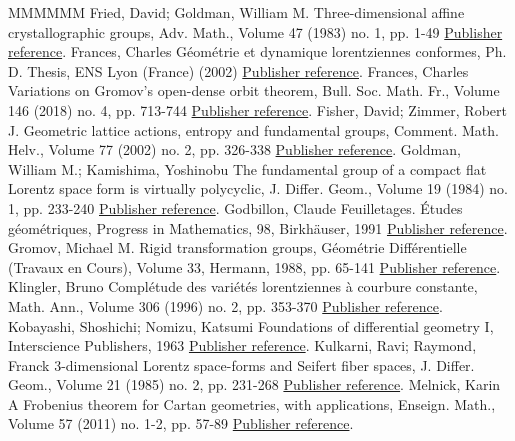 \documentclass[11pt]{article}
\theoremstyle{definition}
\numberwithin{equation}{section}
\numberwithin{figure}{section}
\numberwithin{table}{section}
\begin{document}
\begin{thebibliography}{MMMMMM}
 Fried, David; Goldman, William M. Three-dimensional affine crystallographic groups, Adv. Math., Volume 47 (1983) no. 1, pp. 1-49 \href{https://ahl.centre-mersenne.org/item/AHL_2020__3__407_0/#fried.goldman}{Publisher reference}.
 Frances, Charles Géométrie et dynamique lorentziennes conformes, Ph. D. Thesis, ENS Lyon (France) (2002) \href{https://ahl.centre-mersenne.org/item/AHL_2020__3__407_0/#charlesthese}{Publisher reference}.
 Frances, Charles Variations on Gromov’s open-dense orbit theorem, Bull. Soc. Math. Fr., Volume 146 (2018) no. 4, pp. 713-744 \href{https://ahl.centre-mersenne.org/item/AHL_2020__3__407_0/#frances.open}{Publisher reference}.
 Fisher, David; Zimmer, Robert J. Geometric lattice actions, entropy and fundamental groups, Comment. Math. Helv., Volume 77 (2002) no. 2, pp. 326-338 \href{https://ahl.centre-mersenne.org/item/AHL_2020__3__407_0/#fisher.zimmer}{Publisher reference}.
 Goldman, William M.; Kamishima, Yoshinobu The fundamental group of a compact flat Lorentz space form is virtually polycyclic, J. Differ. Geom., Volume 19 (1984) no. 1, pp. 233-240 \href{https://ahl.centre-mersenne.org/item/AHL_2020__3__407_0/#goldman.kami}{Publisher reference}.
 Godbillon, Claude Feuilletages. Études géométriques, Progress in Mathematics, 98, Birkhäuser, 1991 \href{https://ahl.centre-mersenne.org/item/AHL_2020__3__407_0/#godbillon}{Publisher reference}.
 Gromov, Michael M. Rigid transformation groups, Géométrie Différentielle (Travaux en Cours), Volume 33, Hermann, 1988, pp. 65-141 \href{https://ahl.centre-mersenne.org/item/AHL_2020__3__407_0/#gromov}{Publisher reference}.
 Klingler, Bruno Complétude des variétés lorentziennes à courbure constante, Math. Ann., Volume 306 (1996) no. 2, pp. 353-370 \href{https://ahl.centre-mersenne.org/item/AHL_2020__3__407_0/#klingler}{Publisher reference}.
 Kobayashi, Shoshichi; Nomizu, Katsumi Foundations of differential geometry I, Interscience Publishers, 1963 \href{https://ahl.centre-mersenne.org/item/AHL_2020__3__407_0/#kobanomi}{Publisher reference}.
 Kulkarni, Ravi; Raymond, Franck 3-dimensional Lorentz space-forms and Seifert fiber spaces, J. Differ. Geom., Volume 21 (1985) no. 2, pp. 231-268 \href{https://ahl.centre-mersenne.org/item/AHL_2020__3__407_0/#kulkarni.raymond}{Publisher reference}.
 Melnick, Karin A Frobenius theorem for Cartan geometries, with applications, Enseign. Math., Volume 57 (2011) no. 1-2, pp. 57-89 \href{https://ahl.centre-mersenne.org/item/AHL_2020__3__407_0/#melnick}{Publisher reference}.

\end{thebibliography}
\end{document}
